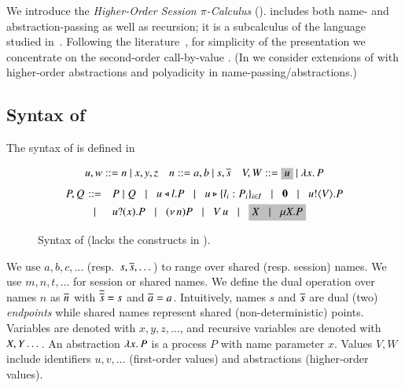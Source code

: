 \noindent 
We introduce the 
\emph{Higher-Order Session $\pi$-Calculus} (\HOp).
\HOp includes both name- and abstraction-passing 
as well as recursion; it is a subcalculus 
of the language
studied 
in~\cite{tlca07}. 
Following the literature~\cite{JeffreyR05},
for simplicity of the presentation
we concentrate on the second-order call-by-value \HOp.  
(In  we consider extensions of 
\HOp with higher-order abstractions 
and polyadicity in name-passing/abstractions.)


\subsection{Syntax of \HOp}
\label{subsec:syntax}
\noindent{} The syntax of \HOp is defined in 
\begin{figure}[t]
\[ 
\begin{array}{lll}
u,w  ::=  n \ | \ x,y,z
& n ::= a,b  \ | \ s, \dual{s} 
& V,W  ::=   \nonhosyntax{u} \ | \ \abs{x}{P}
\end{array}
\]
\[
\begin{array}{rclllll}
P,Q \!\!\!\!\!\! & ::= & \!\! P\Par Q \bnfbar 
 \bsel{u}{l} P \bnfbar \bbra{u}{l_i:P_i}_{i \in I} \bnfbar \inact \bnfbar \bout{u}{V}{P} \\[1mm]
 & \bnfbar & \!\! \binp{u}{x}{P} \bnfbar \news{n} P 
\bnfbar 
\appl{V}{u}
\bnfbar \nonhosyntax{\rvar{X} \bnfbar \recp{X}{P}}
\end{array}
\]
 \caption{Syntax of \HOp (\HO lacks the constructs in ).}
\label{fig:syntax}
\Hlinefig
\end{figure}
We use $a,b,c, \dots$ (resp.~$s, \overline{s}, \dots$) 
to range over shared (resp. session) names. 
We use $m, n, t, \dots$ for session or shared names. 
We define the dual operation over names $n$ as $\overline{n}$ with
$\overline{\overline{s}} = s$ and $\overline{a} = a$.
Intuitively, names $s$ and $\overline{s}$ are dual (two) \emph{endpoints} while 
shared names represent shared (non-deterministic) points. 
Variables are denoted with $x, y, z, \dots$, 
and recursive variables are denoted with $X, Y \dots$.
An abstraction %
$\lambda x.\,P$ is a process $P$ with name parameter $x$.
Values $V,W$ include 
identifiers $u, v, \ldots$ (first-order values) and 
abstractions (higher-order values). 

